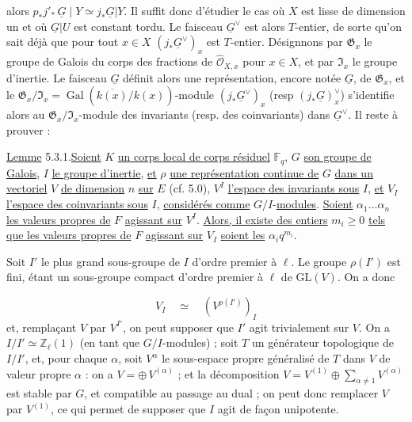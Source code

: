 alors $p_*j'_*\,\underline{G} \mid Y \simeq j_*\underline{G}|Y$. Il suffit donc d'étudier le cas où $X$ est lisse de dimension un et où $\underline{G}|U$ est constant tordu. Le faisceau $\underline{G}^\vee$ est alors $T$-entier, de sorte qu'on sait déjà que pour tout $x \in X$ $(j_* \underline{G}^\vee)_x$
est $T$-entier. Désignnons par $\mathfrak{G}_x$ le groupe de Galois du corps des fractions de $\hat{\mathcal{O}}_{X,x}$ pour $x \in X$, et par $\mathfrak{I}_x$ le groupe d'inertie. Le faisceau $\underline{G}$ définit alors une représentation, encore notée $\underline{G}$, de $\mathfrak{G}_x$, et le $\mathfrak{G}_x/\mathfrak{I}_x = \operatorname{Gal}(\overline{k(x)}/k(x))$-module $(j_*\underline{G}^\vee)_x$ (resp $(j_*\underline{G})_x^\vee$) s'identifie alors au $\mathfrak{G}_x/\mathfrak{I}_x$-module des invariants (resp. des coinvariants) dans $\underline{G}^\vee$. Il reste à prouver :

\underline{Lemme} 5.3.1.\quad \underline{Soient} $K$ \underline{un corps local de corps résiduel} $\mathbb{F}_q$, $G$ \underline{son groupe de Galois}, $I$ \underline{le groupe d'inertie}, \underline{et} $\rho$ \underline{une représentation continue de} $G$ \underline{dans un vectoriel} $V$ \underline{de dimension} $n$ \underline{sur} $E$ (cf. 5.0), $V^I$ \underline{l'espace des invariants sous} $I$, \underline{et} $V_I$ \underline{l'espace des coinvariants sous} $I$, \underline{considérés comme} $G/I$-\underline{modules}. \underline{Soient} $\alpha_1 \ldots \alpha_n$ \underline{les valeurs propres de} $F$ \underline{agissant sur} $V^I$. \underline{Alors, il existe des entiers} $m_i \geq 0$ \underline{tels que les valeurs propres de} $F$ \underline{agissant sur} $V_I$ \underline{soient les} $\alpha_i q^{m_i}$.

Soit $I'$ le plus grand sous-groupe de $I$ d'ordre premier à $\ell$. Le groupe $\rho(I')$ est fini, étant un sous-groupe compact d'ordre premier à $\ell$ de $\mathrm{GL}(V)$. On a donc

\begin{equation*}
V_I \quad \simeq \quad (V^{\rho(I')})_I
\end{equation*}
et, remplaçant $V$ par $V^{I'}$, on peut supposer que $I'$ agit trivialement sur $V$. On a $I/I' \simeq \mathbb{Z}_\ell(1)$ (en tant que $G/I$-modules) ; soit $T$ un générateur topologique de $I/I'$, et, pour chaque $\alpha$, soit $V^\alpha$ le sous-espace propre généralisé de $T$ dans $V$ de valeur propre $\alpha$ : on a $V = \oplus\, V^{(\alpha)}$ ; et la décomposition $V = V^{(1)} \oplus \sum_{\alpha \neq 1} V^{(\alpha)}$ est stable par $G$, et compatible
au passage au dual ; on peut donc remplacer $V$ par $V^{(1)}$, ce qui permet de supposer que $I$ agit de façon unipotente.

